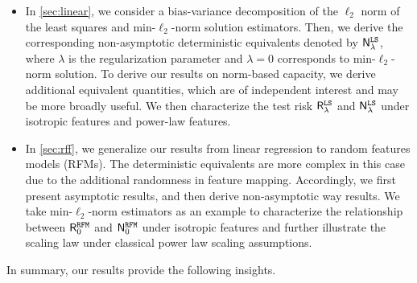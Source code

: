 \begin{itemize}
    \item In \cref{sec:linear}, we consider a bias-variance decomposition of the $\ell_2$ norm of the least squares and min-$\ell_2$-norm solution estimators. Then, we  derive the corresponding non-asymptotic deterministic equivalents denoted by $\mathsf N^{\tt LS}_{\lambda}$,   where  $\lambda$ is the regularization parameter and $\lambda=0$ corresponds to min-$\ell_2$-norm solution. 
    To derive our results on norm-based capacity, we derive additional equivalent quantities, which are of independent interest and may be more broadly useful. We then characterize the test risk $\mathsf R^{\tt LS}_{\lambda}$ and $\mathsf N^{\tt LS}_{\lambda}$ under isotropic features and power-law features.
    \vspace{-0.1cm}
    \item In \cref{sec:rff}, we generalize our results from linear regression to random features models (RFMs). The deterministic equivalents are more complex in this case due to the additional randomness in feature mapping. Accordingly, we first present asymptotic results, and then derive non-asymptotic way results.
    We take min-$\ell_2$-norm estimators as an example to characterize the relationship between $\mathsf R^{\tt RFM}_{0}$ and $\mathsf N^{\tt RFM}_{0}$ under isotropic features and further illustrate the scaling law under classical power law scaling assumptions. 
\end{itemize}
In summary, our results provide the following insights. 

